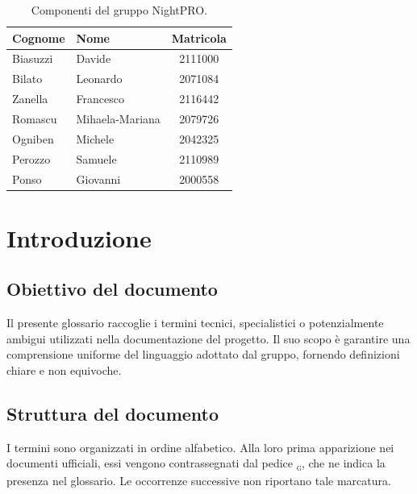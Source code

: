 \documentclass[a4paper, 11pt, oneside]{scrartcl} %
\begin{document}
\begin{table}[h!]
    \centering
    \renewcommand{\arraystretch}{1.2} %
    \begin{tabular}{@{}llc@{}}
        \toprule
        \textbf{Cognome} & \textbf{Nome}   & \textbf{Matricola} \\
        \midrule
        Biasuzzi         & Davide          & 2111000            \\
        Bilato           & Leonardo        & 2071084            \\
        Zanella          & Francesco       & 2116442            \\
        Romascu          & Mihaela-Mariana & 2079726            \\
        Ogniben          & Michele         & 2042325            \\
        Perozzo          & Samuele         & 2110989            \\
        Ponso            & Giovanni        & 2000558            \\
        \bottomrule
    \end{tabular}
    \caption{Componenti del gruppo NightPRO.}
\end{table}



\section{Introduzione}

\subsection{Obiettivo del documento}
Il presente glossario raccoglie i termini tecnici, specialistici o potenzialmente ambigui utilizzati nella documentazione del progetto.
Il suo scopo è garantire una comprensione uniforme del linguaggio adottato dal gruppo, fornendo definizioni chiare e non equivoche.
\subsection{Struttura del documento}
I termini sono organizzati in ordine alfabetico.
Alla loro prima apparizione nei documenti ufficiali, essi vengono contrassegnati dal pedice \textsubscript{\textsc{g}}, che ne indica la presenza nel glossario.
Le occorrenze successive non riportano tale marcatura.
\end{document}
